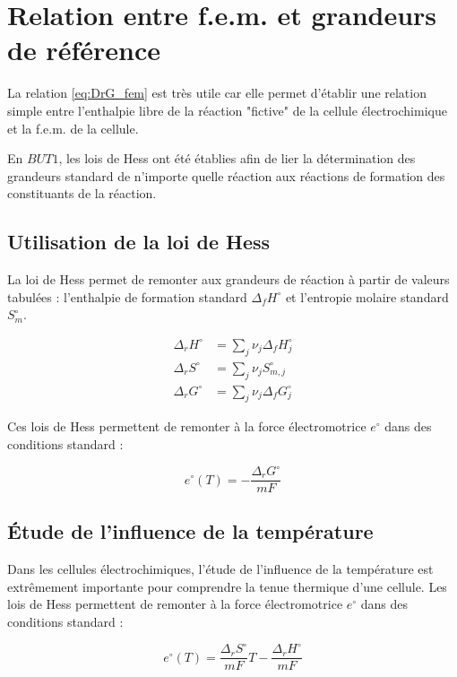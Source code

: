 \section{Relation entre f.e.m. et grandeurs de référence}

La relation \ref{eq:DrG_fem} est très utile car elle permet d'établir une relation simple entre l'enthalpie libre de la réaction "fictive" de la cellule électrochimique et la f.e.m. de la cellule.

En $BUT1$, les lois de Hess ont été établies afin de lier la détermination des grandeurs standard de n'importe quelle réaction aux réactions de formation des constituants de la réaction.

\subsection{Utilisation de la loi de Hess}

La loi de Hess permet de remonter aux grandeurs de réaction à partir de valeurs tabulées : l'enthalpie de formation standard $\Delta_f H^\circ$ et l'entropie molaire standard $S_m^\circ$.

\begin{align}
\Delta_r H^\circ &= \sum_j \nu_j \Delta_f H_j^\circ \\
\Delta_r S^\circ &= \sum_j \nu_j S_{m,j}^\circ \\
\Delta_r G^\circ &= \sum_j \nu_j \Delta_f G_j^\circ
\end{align}

Ces lois de Hess permettent de remonter à la force électromotrice $e^\circ$ dans des conditions standard : 

\begin{equation}
e^\circ (T) = - \frac{\Delta_r G^\circ}{mF}
\end{equation}


\subsection{\'{E}tude de l'influence de la température}

Dans les cellules électrochimiques, l'étude de l'influence de la température est extrêmement importante pour comprendre la tenue thermique d'une cellule. Les lois de Hess permettent de remonter à la force électromotrice $e^\circ$ dans des conditions standard : 

\begin{equation}
e^\circ (T) = \frac{\Delta_r S^\circ}{mF} T - \frac{\Delta_r H^\circ}{mF}
\end{equation}

